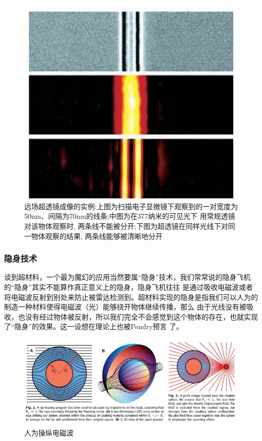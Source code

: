 \documentclass[UTF8]{ctexart}
\begin{document}
\begin{figure}[H]
\centering
\includegraphics{KXSJ201906013_04800.jpg}
\caption{远场超透镜成像的实例:上图为扫描电子显微镜下观察到的一对宽度为50nm、间隔为70nm的线条;中图为在377纳米的可见光下
用常规透镜对该物体观察时, 两条线不能被分开;下图为超透镜在同样光线下对同一物体观察的结果, 两条线能够被清晰地分开}  
\end{figure}

\subsubsection{隐身技术}
谈到超材料，一个最为魔幻的应用当然要属“隐身”技术，我们常常说的隐身飞机的“隐身”其实不能算作真正意义上的隐身，隐身飞机往往
是通过吸收电磁波或者将电磁波反射到别处来防止被雷达检测到。超材料实现的隐身是指我们可以人为的制造一种材料使得电磁波（光）能够绕开物体继续传播，那么
由于光线没有被吸收，也没有经过物体被反射，所以我们完全不会感觉到这个物体的存在，也就实现了“隐身”的效果。这一设想在理论上也被Pendry预言
了\cite{RN20}。
\begin{figure}[htbp]
\centering
\includegraphics[width=\textwidth]{wave.jpg}
\caption{人为操纵电磁波}   
\end{figure}
\end{document}
